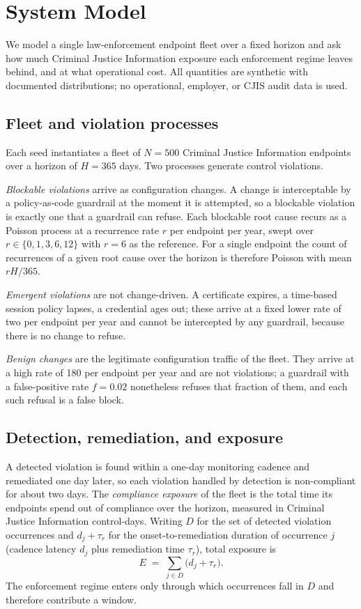 \documentclass[journal]{IEEEtran}
\begin{document}
\section{System Model}
We model a single law-enforcement endpoint fleet over a fixed horizon and ask how much Criminal
Justice Information exposure each enforcement regime leaves behind, and at what operational cost.
All quantities are synthetic with documented distributions; no operational, employer, or CJIS audit
data is used.

\subsection{Fleet and violation processes}
Each seed instantiates a fleet of $N = 500$ Criminal Justice Information endpoints over a horizon of
$H = 365$ days. Two processes generate control violations.

\emph{Blockable violations} arrive as configuration changes. A change is interceptable by a
policy-as-code guardrail at the moment it is attempted, so a blockable violation is exactly one that
a guardrail can refuse. Each blockable root cause recurs as a Poisson process at a recurrence rate
$r$ per endpoint per year, swept over $r \in \{0, 1, 3, 6, 12\}$ with $r = 6$ as the reference. For
a single endpoint the count of recurrences of a given root cause over the horizon is therefore
Poisson with mean $r H / 365$.

\emph{Emergent violations} are not change-driven. A certificate expires, a time-based session
policy lapses, a credential ages out; these arrive at a fixed lower rate of two per endpoint per
year and cannot be intercepted by any guardrail, because there is no change to refuse.

\emph{Benign changes} are the legitimate configuration traffic of the fleet. They arrive at a high
rate of 180 per endpoint per year and are not violations; a guardrail with a false-positive rate
$f = 0.02$ nonetheless refuses that fraction of them, and each such refusal is a false block.

\subsection{Detection, remediation, and exposure}
A detected violation is found within a one-day monitoring cadence and remediated one day later, so
each violation handled by detection is non-compliant for about two days. The \emph{compliance
exposure} of the fleet is the total time its endpoints spend out of compliance over the horizon,
measured in Criminal Justice Information control-days. Writing $D$ for the set of detected violation
occurrences and $d_j + \tau_r$ for the onset-to-remediation duration of occurrence $j$ (cadence
latency $d_j$ plus remediation time $\tau_r$), total exposure is
\begin{equation}
E \;=\; \sum_{j \in D} \big( d_j + \tau_r \big).
\label{eq:exposure}
\end{equation}
The enforcement regime enters only through which occurrences fall in $D$ and therefore contribute a
window.
\end{document}

